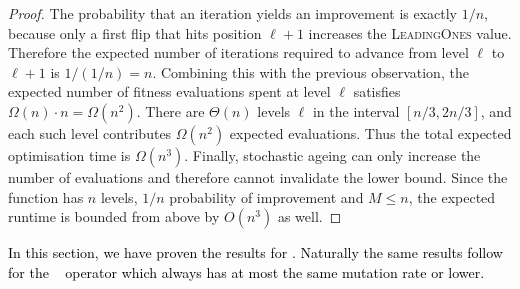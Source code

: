 \begin{proof}
The probability that an iteration yields an improvement is exactly $1/n$, because only a first flip that hits position $\ell+1$ increases the \textsc{LeadingOnes} value. Therefore the expected number of iterations required to advance from level $\ell$ to $\ell+1$ is $1/(1/n)=n$. Combining this with the previous observation, the expected number of fitness evaluations spent at level $\ell$ satisfies $\Omega(n)\cdot n=\Omega(n^2)$.
There are $\Theta(n)$ levels $\ell$ in the interval $[n/3,2n/3]$, and each such level contributes $\Omega(n^2)$ expected evaluations. Thus the total expected optimisation time is $\Omega(n^3)$. Finally, stochastic ageing can only increase the number of evaluations and therefore cannot invalidate the lower bound. Since the function has $n$ levels, $1/n$ probability of improvement and $M\leq n$, the expected runtime is bounded from above by $O(n^3)$ as well.


\end{proof}

\textcolor{black}{In this section, we have proven the results for \linHD. Naturally the same  results follow for the \expoHD~ operator which always has at most the same mutation rate or lower.}


%
%
%
%
%
